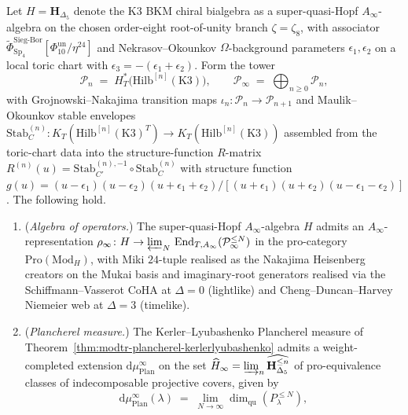 \begin{theorem}
\label{thm:modtr-plancherel-HS-MO-extension}
Let $H = \mathbf H_{\Delta_5}$ denote the K3 BKM chiral bialgebra as a
super-quasi-Hopf $A_\infty$-algebra on the chosen order-eight
root-of-unity branch \(\zeta=\zeta_8\), with associator
$\widetilde\Phi^{\mathrm{Sieg\text{-}Bor}}_{\mathrm{Sp}_4}[\Phi_{10}^{\mathrm{un}}/\eta^{24}]$
and Nekrasov--Okounkov $\Omega$-background parameters
$\epsilon_1,\epsilon_2$ on a local toric chart with
$\epsilon_3 = -(\epsilon_1+\epsilon_2)$. Form the tower
\[
 \mathcal P_n \;=\; H^*_T\bigl(\mathrm{Hilb}^{[n]}(\mathrm K3)\bigr),
 \qquad
 \mathcal P_\infty
 \;=\;
 \bigoplus_{n \geq 0}\mathcal P_n,
\]
with Grojnowski--Nakajima transition maps
$\iota_n \colon \mathcal P_n \to \mathcal P_{n+1}$ and
Maulik--Okounkov stable envelopes
$\mathrm{Stab}_C^{(n)} \colon K_T(\mathrm{Hilb}^{[n]}(\mathrm K3)^T) \to
K_T(\mathrm{Hilb}^{[n]}(\mathrm K3))$ assembled from the toric-chart
data into the structure-function $R$-matrix
$R^{(n)}(u) = \mathrm{Stab}_{C'}^{(n),-1}\circ\mathrm{Stab}_C^{(n)}$
with structure function
$g(u) = (u - \epsilon_1)(u - \epsilon_2)(u + \epsilon_1 + \epsilon_2) /
 [(u + \epsilon_1)(u + \epsilon_2)(u - \epsilon_1 - \epsilon_2)]$.
The following hold.
\begin{enumerate}[label=\textup{(\alph*)}]
\item (\emph{Algebra of operators.}) The super-quasi-Hopf
$A_\infty$-algebra
$H$ admits an $A_\infty$-representation
$\rho_\infty \colon H \to
 \varprojlim_N\,\mathrm{End}_{T,A_\infty}(\mathcal P_\infty^{\leq N})$
in the pro-category $\mathrm{Pro}(\mathrm{Mod}_H)$, with Miki $24$-tuple
realised as the Nakajima Heisenberg creators on the Mukai basis and
imaginary-root generators realised via the Schiffmann--Vasserot CoHA
at $\Delta = 0$ (lightlike) and Cheng--Duncan--Harvey Niemeier web at
$\Delta = 3$ (timelike).
\item (\emph{Plancherel measure.}) The Kerler--Lyubashenko Plancherel
measure of Theorem~\ref{thm:modtr-plancherel-kerlerlyubashenko}
admits a weight-completed extension $\mathrm d\mu_{\mathrm{Plan}}^\infty$
on the set
$\widehat H_\infty = \varinjlim_n\widehat{\mathbf H_{\Delta_5}^{\leq n}}$
of pro-equivalence classes of indecomposable projective covers, given
by
\[
 \mathrm d\mu_{\mathrm{Plan}}^\infty(\lambda)
 \;=\;
 \lim_{N \to \infty}\dim_{\mathrm{qu}}(P_\lambda^{\leq N}),
\]
\end{enumerate}
\end{theorem}
